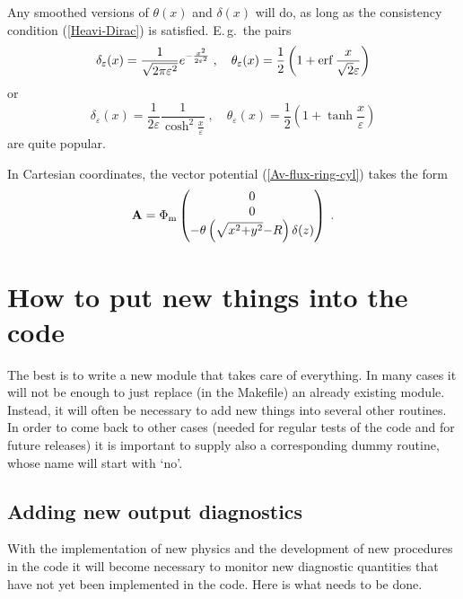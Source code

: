 \documentclass[12pt,twoside,notitlepage,a4paper]{article}
\newcommand{\erf}     {\mathop{\rm erf}\nolimits}
\newcommand{\vekt}[1] {\mathbf{#1}}
\newcommand{\Av}            {\vekt{A}}
\newcommand{\Heavi}         {\theta}
\begin{document}
Any smoothed versions of $\Heavi(x)$ and $\delta(x)$ will do, as long as
the consistency condition (\ref{Heavi-Dirac}) is satisfied.
E.\,g.~the pairs
\begin{equation}
  \delta_\varepsilon(x)
  = \frac{1}{\sqrt{2\pi\varepsilon^2}} e^{-\frac{x^2}{2\varepsilon^2}} \; ,
  \quad
  \Heavi_\varepsilon(x)
  = \frac{1}{2} \left( 1 + \erf\frac{x}{\sqrt{2}\varepsilon} \right)
\end{equation}
or
\begin{equation}
  \delta_\varepsilon(x)
  = \frac{1}{2\varepsilon}\frac{1}{\cosh^2\frac{x}{\varepsilon}} \; ,
  \quad
  \Heavi_\varepsilon(x)
  = \frac{1}{2} \left( 1 + \tanh\frac{x}{\varepsilon} \right)
\end{equation}
are quite popular.

In Cartesian coordinates, the vector potential (\ref{Av-flux-ring-cyl})
takes the form
\begin{equation} \label{Av-flux-ring-cart}
  \Av =
  \Phi_{\rm m}
  \begin{pmatrix}
    0\\ 0\\ -\Heavi \left( \sqrt{x^2{+}y^2}{-}R \right) \delta(z)
  \end{pmatrix} \; .
\end{equation}



\section{How to put new things into the code}

The best is to write a new module that takes care of everything.
In many cases it will not be enough to just replace (in the Makefile)
an already existing module. Instead, it will often be necessary to
add new things into several other routines. In order to come back
to other cases (needed for regular tests of the code and for future
releases) it is important to supply also a corresponding dummy routine,
whose name will start with `no'.

\subsection{Adding new output diagnostics}

With the implementation of new physics and the development of new procedures
in the code it will become necessary to monitor new diagnostic quantities that
have not yet been implemented in the code. Here is what needs to be done.
\end{document}
